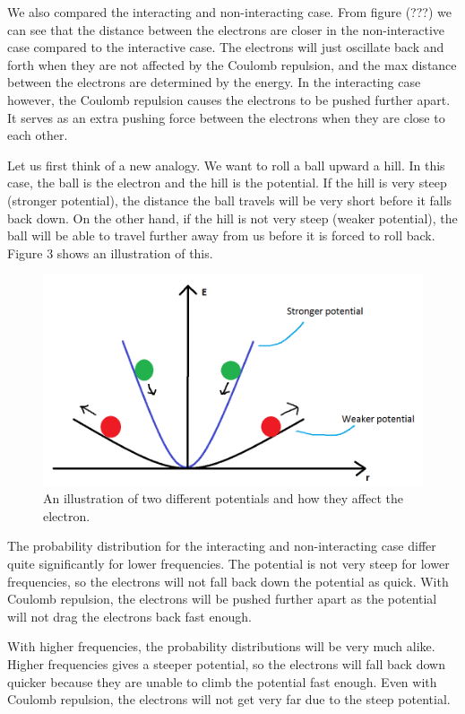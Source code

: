 \documentclass[12pt]{article}
\begin{document}
We also compared the interacting and non-interacting case. From figure (???) we can see that the distance between the electrons are closer in the non-interactive case compared to the interactive case. The electrons will just oscillate back and forth when they are not affected by the Coulomb repulsion, and the max distance between the electrons are determined by the energy. In the interacting case however, the Coulomb repulsion causes the electrons to be pushed further apart. It serves as an extra pushing force between the electrons when they are close to each other.

Let us first think of a new analogy. We want to roll a ball upward a hill. In this case, the ball is the electron and the hill is the potential. If the hill is very steep (stronger potential), the distance the ball travels will be very short before it falls back down. On the other hand, if the hill is not very steep (weaker potential), the ball will be able to travel further away from us before it is forced to roll back. Figure 3 shows an illustration of this.
\begin{figure}[hbtp]
\centering
\includegraphics[width=\linewidth]{Potential_illustration2.png}
\caption{An illustration of two different potentials and how they affect the electron.}
\end{figure}


The probability distribution for the interacting and non-interacting case differ quite significantly for lower frequencies. The potential is not very steep for lower frequencies, so the electrons will not fall back down the potential as quick. With Coulomb repulsion, the electrons will be pushed further apart as the potential will not drag the electrons back fast enough.

With higher frequencies, the probability distributions will be very much alike. Higher frequencies gives a steeper potential, so the electrons will fall back down quicker because they are unable to climb the potential fast enough. Even with Coulomb repulsion, the electrons will not get very far due to the steep potential.
\end{document}
